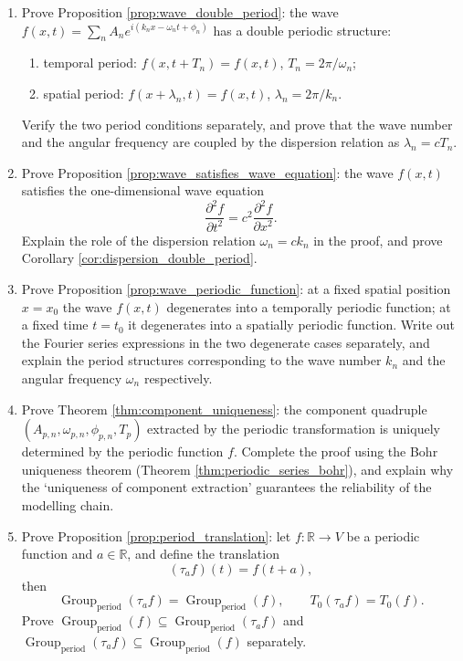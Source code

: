 \begin{enumerate}[leftmargin=3em, label=\textbf{Exercise \arabic*}]
    \item Prove Proposition \ref{prop:wave_double_period}:
    the wave $f(x,t)=\sum_nA_ne^{i(k_nx-\omega_nt+\phi_n)}$ has a double periodic structure:
    \begin{enumerate}[label=(\roman*)]
        \item temporal period: $f(x,t+T_n)=f(x,t)$, $T_n=2\pi/\omega_n$;
        \item spatial period: $f(x+\lambda_n,t)=f(x,t)$, $\lambda_n=2\pi/k_n$.
    \end{enumerate}
    Verify the two period conditions separately, and prove that the wave number and the angular frequency are coupled by the dispersion relation as $\lambda_n=cT_n$.

    \item Prove Proposition \ref{prop:wave_satisfies_wave_equation}:
    the wave $f(x,t)$ satisfies the one-dimensional wave equation
    \[
    \frac{\partial^2 f}{\partial t^2}=c^2\frac{\partial^2 f}{\partial x^2}.
    \]
    Explain the role of the dispersion relation $\omega_n=ck_n$ in the proof, and prove Corollary \ref{cor:dispersion_double_period}.

    \item Prove Proposition \ref{prop:wave_periodic_function}:
    at a fixed spatial position $x=x_0$ the wave $f(x,t)$ degenerates into a temporally periodic function;
    at a fixed time $t=t_0$ it degenerates into a spatially periodic function.
    Write out the Fourier series expressions in the two degenerate cases separately,
    and explain the period structures corresponding to the wave number $k_n$ and the angular frequency $\omega_n$ respectively.

    \item Prove Theorem \ref{thm:component_uniqueness}:
    the component quadruple $(A_{p,n},\omega_{p,n},\phi_{p,n},T_p)$ extracted by the periodic transformation
    is uniquely determined by the periodic function $f$.
    Complete the proof using the Bohr uniqueness theorem (Theorem \ref{thm:periodic_series_bohr}),
    and explain why the `uniqueness of component extraction' guarantees the reliability of the modelling chain.

    \item Prove Proposition \ref{prop:period_translation}:
    let $f:\mathbb{R}\to V$ be a periodic function and $a\in\mathbb{R}$, and define the translation
    \[
    (\tau_af)(t)=f(t+a),
    \]
    then
    \[
    \operatorname{Group}_{\mathrm{period}}(\tau_af)=\operatorname{Group}_{\mathrm{period}}(f),\qquad
    T_0(\tau_af)=T_0(f).
    \]
    Prove $\operatorname{Group}_{\mathrm{period}}(f)\subseteq\operatorname{Group}_{\mathrm{period}}(\tau_af)$
    and $\operatorname{Group}_{\mathrm{period}}(\tau_af)\subseteq\operatorname{Group}_{\mathrm{period}}(f)$ separately.


\end{enumerate}
